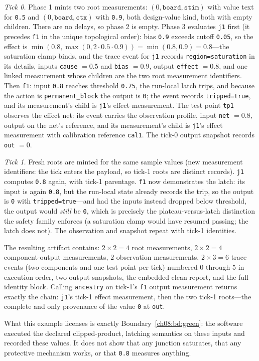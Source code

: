 \begin{example}
\emph{Tick 0.} Phase 1 mints two root measurements: $(0, \texttt{board}, \texttt{stim})$ with value text for \texttt{0.5} and $(0, \texttt{board}, \texttt{ctx})$ with \texttt{0.9}, both design-value kind, both with empty children. There are no delays, so phase 2 is empty. Phase 3 evaluates \texttt{j1} first (it precedes \texttt{f1} in the unique topological order): bias \texttt{0.9} exceeds cutoff \texttt{0.05}, so the effect is $\min(0.8, \max(0, 2 \cdot 0.5 \cdot 0.9)) = \min(0.8, 0.9) = 0.8$---the saturation clamp binds, and the trace event for \texttt{j1} records \texttt{region=saturation} in its details, inputs \texttt{cause} $= 0.5$ and \texttt{bias} $= 0.9$, output \texttt{effect} $= 0.8$, and one linked measurement whose children are the two root measurement identifiers. Then \texttt{f1}: input \texttt{0.8} reaches threshold \texttt{0.75}, the run-local latch trips, and because the action is \texttt{permanent\_block} the output is \texttt{0}; the event records \texttt{tripped=true}, and its measurement's child is \texttt{j1}'s effect measurement. The test point \texttt{tp1} observes the effect net: its event carries the observation profile, input \texttt{net} $= 0.8$, output on the net's reference, and its measurement's child is \texttt{j1}'s effect measurement with calibration reference \texttt{cal1}. The tick-0 output snapshot records \texttt{out} $= 0$.

\emph{Tick 1.} Fresh roots are minted for the same sample values (new measurement identifiers: the tick enters the payload, so tick-1 roots are distinct records). \texttt{j1} computes \texttt{0.8} again, with tick-1 parentage. \texttt{f1} now demonstrates the latch: its input is again \texttt{0.8}, but the run-local state already records the trip, so the output is \texttt{0} with \texttt{tripped=true}---and had the inputs instead dropped below threshold, the output would \emph{still} be \texttt{0}, which is precisely the plateau-versus-latch distinction the safety family enforces (a saturation clamp would have resumed passing; the latch does not). The observation and snapshot repeat with tick-1 identities.

The resulting artifact contains: $2 \times 2 = 4$ root measurements, $2 \times 2 = 4$ component-output measurements, $2$ observation measurements, $2 \times 3 = 6$ trace events (two components and one test point per tick) numbered $0$ through $5$ in execution order, two output snapshots, the embedded clean report, and the full identity block. Calling \texttt{ancestry} on tick-1's \texttt{f1} output measurement returns exactly the chain: \texttt{j1}'s tick-1 effect measurement, then the two tick-1 roots---the complete and only provenance of the value \texttt{0} at \texttt{out}.

What this example licenses is exactly Boundary~\ref{ch08:bd:green}: the software executed the declared clipped-product, latching semantics on these inputs and recorded these values. It does not show that any junction saturates, that any protective mechanism works, or that \texttt{0.8} measures anything.
\end{example}

